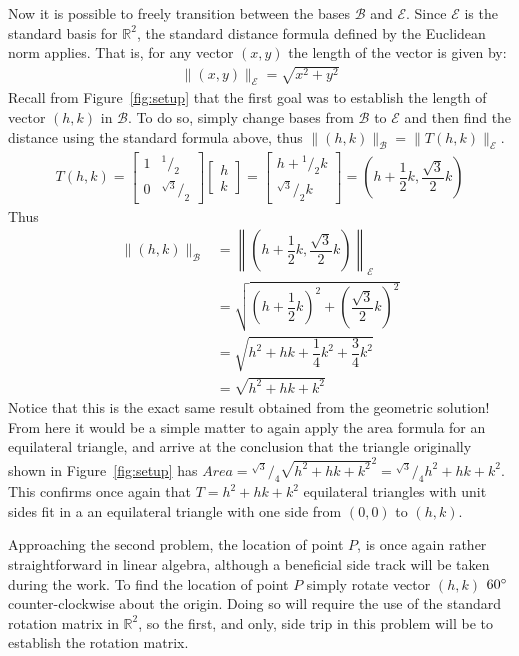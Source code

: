 \documentclass[12pt,letter]{article}
\newcommand*\rfrac[2]{{}^{#1}\!/_{#2}}
\begin{document}
%
Now it is possible to freely transition between the bases $\mathcal{B}$ and $\mathcal{E}$. Since $\mathcal{E}$ is the standard basis for $\mathbb{R}^2$, the standard distance formula defined by the Euclidean norm applies. That is, for any vector $(x,y)$ the length of the vector is given by:
%
\begin{align*}
	\| (x,y) \|_\mathcal{E} = \sqrt{x^2 + y^2}
\end{align*}
%
Recall from Figure~\ref{fig:setup} that the first goal was to establish the length of vector $(h,k)$ in $\mathcal{B}$. To do so, simply change bases from $\mathcal{B}$ to $\mathcal{E}$ and then find the distance using the standard formula above, thus $\| (h, k) \|_\mathcal{B} = \| T(h,k) \|_\mathcal{E}$.
%
\begin{align*}
	T(h,k) =
	\begin{bmatrix}
		1 & \rfrac{1}{2}\\
		0 & \rfrac{\sqrt{3}}{2} 
	\end{bmatrix}
	\begin{bmatrix}
		h \\
		k
	\end{bmatrix}
	= \begin{bmatrix}
		h + \rfrac{1}{2} k \\
		\rfrac{\sqrt{3}}{2} k
	\end{bmatrix}
	= \left(h + \dfrac{1}{2} k , \dfrac{\sqrt{3}}{2} k \right)
\end{align*}
Thus
\begin{align*}
	\| (h, k) \|_\mathcal{B} &= \left\| \left(h + \dfrac{1}{2} k , \dfrac{\sqrt{3}}{2} k \right) \right\|_\mathcal{E} \\
	&= \sqrt{\left(h + \dfrac{1}{2} k \right)^2 + \left(\dfrac{\sqrt{3}}{2} k \right)^2} \\
	&= \sqrt{h^2 + hk + \dfrac 1 4 k^2 + \dfrac 3 4 k^2} \\
	&= \sqrt{h^2 + hk + k^2}
\end{align*}
%
Notice that this is the exact same result obtained from the geometric solution! From here it would be a simple matter to again apply the area formula for an equilateral triangle, and arrive at the conclusion that the triangle originally shown in Figure~\ref{fig:setup} has $Area = \rfrac{\sqrt{3}}{4}\sqrt{h^2 + hk + k^2}^2 = \rfrac{\sqrt{3}}{4}h^2 + hk + k^2$. This confirms once again that $T=h^2 +hk +k^2$ equilateral triangles with unit sides fit in a an equilateral triangle with one side from $(0,0)$ to $(h,k)$.

Approaching the second problem, the location of point $P$, is once again rather straightforward in linear algebra, although a beneficial side track will be taken during the work. To find the location of point $P$ simply rotate vector $(h,k)$ $60\degree$ counter-clockwise about the origin. Doing so will require the use of the standard rotation matrix in $\mathbb{R}^2$, so the first, and only, side trip in this problem will be to establish the rotation matrix.
\end{document}
